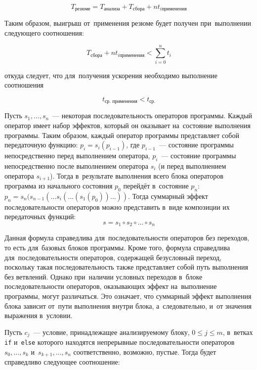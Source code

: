\begin{equation}
 T_{\text{резюме}} = T_{\text{анализа}} + T_{\text{сбора}} + n t_{i \text{применения}}
\end{equation}

Таким образом, выигрыш от~применения резюме будет получен при~выполнении следующего соотношения:

\begin{equation}
 T_{\text{сбора}} + n t_{i \text{применения}} < \sum_{i = 0}^{n} t_{i}
\end{equation}

откуда следует, что для~получения ускорения необходимо выполнение соотношения

\begin{equation}
 t_{\text{ср. применения}} <  t_{\text{ср.}}
\end{equation}

Пусть $s_1, \ldots, s_n$~--- некоторая последовательность операторов программы. Каждый оператор имеет набор эффектов, который он оказывает на~состояние выполнения программы. Таким образом, каждый оператор программы представляет собой передаточную функцию: $p_i = s_i(p_{i-1})$, где $p_{i-1}$~--- состояние программы непосредственно перед выполнением оператора, $p_i$~--- состояние программы непосредственно после выполнением оператора  $s_i$ (и перед выполнением оператора $s_{i+1}$). Тогда в~результате выполнения всего блока операторов программа из начального состояния $p_0$ перейдёт в~состояние $p_n$: $p_n = s_n(s_{n-1}( \ldots s_i( \ldots (s_1(p_0)) \ldots ))$. Тогда суммарный эффект последовательности операторов можно представить в~виде композиции их передаточных функций:
\begin{equation}
 s = s_1 \circ s_2 \circ \ldots \circ s_n
\end{equation}

Данная формула справедлива для~последовательности операторов без переходов, то есть для~базовых блоков программы. Кроме того, формула справедлива для~последовательности операторов, содержащей безусловный переход, поскольку такая последовательность также представляет собой путь выполнения без ветвлений. Однако при~наличии условных переходов в~блоке последовательности операторов, оказывающих эффект на~выполнение программы, могут различаться. Это означает, что суммарный эффект выполнения блока зависит от~пути выполнения внутри блока, а~следовательно, и~от значения  выражения в~условии.

Пусть $c_j$~--- условие, принадлежащее анализируемому блоку, $0 \leqslant j \leqslant m$, в~ветках \texttt{if} и~\texttt{else} которого находятся непрерывные последовательности операторов $s_0, \ldots, s_k$ и~$s_{k+1}, \ldots, s_n$ соответственно, возможно, пустые. Тогда будет справедливо следующее соотношение:

